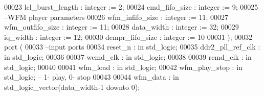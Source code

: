 \begin{DoxyCode}
00023             \textcolor{vhdlchar}{lcl_burst_length}    \textcolor{vhdlchar}{:} \textcolor{comment}{integer} \textcolor{vhdlchar}{:=} \textcolor{vhdllogic}{}\textcolor{vhdllogic}{2};
00024             \textcolor{vhdlchar}{cmd_fifo_size}       \textcolor{vhdlchar}{:} \textcolor{comment}{integer} \textcolor{vhdlchar}{:=} \textcolor{vhdllogic}{}\textcolor{vhdllogic}{9};
00025 \textcolor{keyword}{            --WFM player parameters}
00026             \textcolor{vhdlchar}{wfm_infifo_size} \textcolor{vhdlchar}{:} \textcolor{comment}{integer} \textcolor{vhdlchar}{:=} \textcolor{vhdllogic}{}\textcolor{vhdllogic}{11};
00027             \textcolor{vhdlchar}{wfm_outfifo_size}    \textcolor{vhdlchar}{:} \textcolor{comment}{integer} \textcolor{vhdlchar}{:=} \textcolor{vhdllogic}{}\textcolor{vhdllogic}{11};
00028             \textcolor{vhdlchar}{data_width}          \textcolor{vhdlchar}{:} \textcolor{comment}{integer} \textcolor{vhdlchar}{:=} \textcolor{vhdllogic}{}\textcolor{vhdllogic}{32};
00029             \textcolor{vhdlchar}{iq_width}                \textcolor{vhdlchar}{:} \textcolor{comment}{integer} \textcolor{vhdlchar}{:=} \textcolor{vhdllogic}{}\textcolor{vhdllogic}{12};
00030             \textcolor{vhdlchar}{dcmpr_fifo_size} \textcolor{vhdlchar}{:} \textcolor{comment}{integer} \textcolor{vhdlchar}{:=} \textcolor{vhdllogic}{}\textcolor{vhdllogic}{10}
00031 \textcolor{vhdlchar}{)};
00032   \textcolor{keywordflow}{port} \textcolor{vhdlchar}{(}
00033 \textcolor{keyword}{      --input ports}
00034         \textcolor{vhdlchar}{reset_n}                 \textcolor{vhdlchar}{:} \textcolor{keywordflow}{in} \textcolor{comment}{std\_logic};
00035         \textcolor{vhdlchar}{ddr2_pll_ref_clk}        \textcolor{vhdlchar}{:} \textcolor{keywordflow}{in} \textcolor{comment}{std\_logic};
00036      
00037         \textcolor{vhdlchar}{wcmd_clk}                    \textcolor{vhdlchar}{:} \textcolor{keywordflow}{in} \textcolor{comment}{std\_logic};
00038         
00039         \textcolor{vhdlchar}{rcmd_clk}                    \textcolor{vhdlchar}{:} \textcolor{keywordflow}{in} \textcolor{comment}{std\_logic};
00040         
00041         \textcolor{vhdlchar}{wfm_load}                    \textcolor{vhdlchar}{:} \textcolor{keywordflow}{in} \textcolor{comment}{std\_logic};
00042         \textcolor{vhdlchar}{wfm_play_stop}           \textcolor{vhdlchar}{:} \textcolor{keywordflow}{in} \textcolor{comment}{std\_logic};\textcolor{keyword}{ -- 1- play, 0- stop}
00043 
00044         \textcolor{vhdlchar}{wfm_data}                    \textcolor{vhdlchar}{:} \textcolor{keywordflow}{in} \textcolor{comment}{std\_logic\_vector}\textcolor{vhdlchar}{(}\textcolor{vhdlchar}{data_width}\textcolor{vhdlchar}{-}\textcolor{vhdllogic}{}\textcolor{vhdllogic}{1} \textcolor{keywordflow}{downto} \textcolor{vhdllogic}{}\textcolor{vhdllogic}{0}\textcolor{vhdlchar}{)};

\end{DoxyCode}
